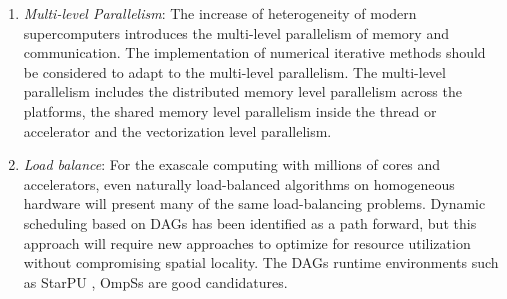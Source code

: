{\begin{enumerate}[label=(\arabic*)]
    In 2013, an analysis of energy-optimized lattice-Boltzmann CFD simulations from the chip to the highly parallel level was introduced by Wittmann et al. \cite{wittmann2013analysis}. Padoin et al. \cite{padoin2013evaluating} evaluated the application performance and energy consumption on hybrid CPU/GPU architecture. In 2015, Anzt et al. \cite{anzt2015energy} unveil some energy efficiency and performance frontiers for sparse computations on GPU-based supercomputers. Aliaga et al. \cite{aliaga2015unveiling} unveil the performance-energy trade-off in iterative linear system solvers for multithreaded processors. In order to gain insights about the benefits of hands-on optimizations, they analyze the runtime and energy efficiency results for both out-of-the-box usage relying exclusively on compiler optimizations, and implementations manually optimized for target architectures, that range from CPUs and DSPs to manycore GPUs.
	
	\item \textit{Multi-level Parallelism}: The increase of heterogeneity of modern supercomputers introduces the multi-level parallelism of memory and communication. The implementation of numerical iterative methods should be considered to adapt to the multi-level parallelism. The multi-level parallelism includes the distributed memory level parallelism across the platforms, the shared memory level parallelism inside the thread or accelerator and the vectorization level parallelism.
	
	\item \textit{Load balance}: For the exascale computing with millions of cores and accelerators, even naturally load-balanced algorithms on homogeneous hardware will present many of the same load-balancing problems. Dynamic scheduling based on DAGs has been identified as a path forward, but this approach will require new approaches to optimize for resource utilization without compromising spatial locality. The DAGs runtime environments such as StarPU \cite{augonnet2011starpu}, OmpSs \cite{duran2011ompss} are good candidatures.
		

\end{enumerate}}
